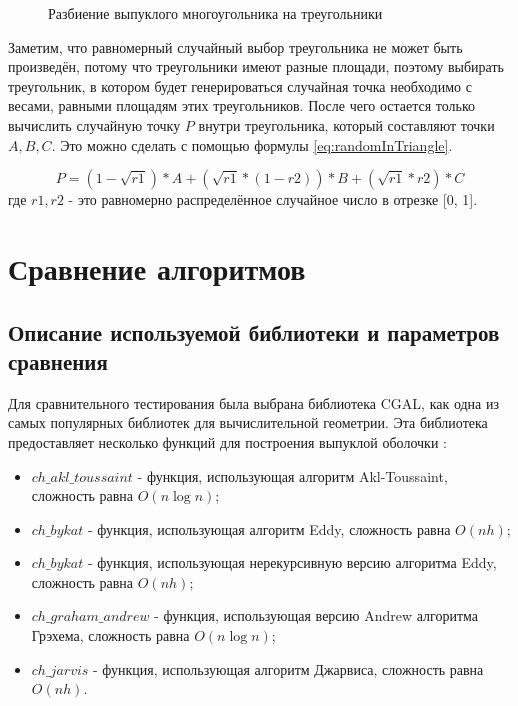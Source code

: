 \begin{figure}[H]
	\centering
	
	\caption{Разбиение выпуклого многоугольника на треугольники}
	\label{img:triangles}
\end{figure}

Заметим, что равномерный случайный выбор треугольника не может быть произведён, потому что треугольники имеют разные площади, поэтому выбирать треугольник, в котором будет генерироваться случайная точка необходимо с весами, равными площадям этих треугольников. После чего остается только вычислить случайную точку $P$ внутри треугольника, который составляют точки $A, B, C$. Это можно сделать с помощью формулы \eqref{eq:randomInTriangle}.

\begin{equation}\label{eq:randomInTriangle}
P = (1 - \sqrt{r1}) * A + (\sqrt{r1} * (1 - r2)) * B + (\sqrt{r1} * r2) * C
\end{equation}
где $r1, r2$ - это равномерно распределённое случайное число в отрезке [0, 1].

\section{Сравнение алгоритмов}

\subsection{Описание используемой библиотеки и параметров сравнения}

Для сравнительного тестирования была выбрана библиотека CGAL, как одна из самых популярных библиотек для вычислительной геометрии. Эта библиотека предоставляет несколько функций для построения выпуклой оболочки \cite{cgalconvexhull}:
\begin{itemize}
	\item $ch\_akl\_toussaint$ - функция, использующая алгоритм Akl-Toussaint\cite{akl1978fast}, сложность равна $O(n \log n)$;
	\item $ch\_bykat$ - функция, использующая алгоритм Eddy\cite{eddy1977new}, сложность равна $O(nh)$;
	\item $ch\_bykat$ - функция, использующая нерекурсивную версию алгоритма Eddy\cite{bykat1978convex}, сложность равна $O(nh)$;
	\item $ch\_graham\_andrew$ - функция, использующая версию Andrew алгоритма Грэхема\cite{andrew1979another}, сложность равна $O(n \log n)$;
	\item $ch\_jarvis$ - функция, использующая алгоритм Джарвиса\cite{jarvis1973Jarvis}, сложность равна $O(nh)$.
\end{itemize}

